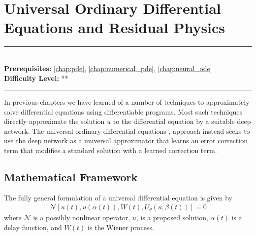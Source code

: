 \documentclass[book.tex]{subfiles}
\begin{document}
\chapter{Universal Ordinary Differential Equations and Residual Physics}

\label{chap:pinns}
\noindent\rule{11cm}{0.4pt} \\
\textbf{Prerequisites:}  \autoref{chap:pde}, \autoref{chap:numerical_pde}, \autoref{chap:neural_ode}  \\
\textbf{Difficulty Level:} ** \\
\noindent\rule{11cm}{0.4pt}
\vspace{5mm}

In previous chapters we have learned of a number of techniques to approximately solve differential equations using differentiable programs. Most such techniques directly approximate the solution $u$ to the differential equation by a suitable deep network. The universal ordinary differential equations \cite{bills2020universal}, \cite{rackauckas2020universal} approach instead seeks to use the deep network as a universal approximator that learns an error correction term that modifies a standard solution with a learned correction term.


\section{Mathematical Framework} 

The fully general formulation of a universal differential equation is given by
\begin{align}
    \mathcal{N}[u(t), u(\alpha(t)), W(t), U_\theta(u, \beta(t))] = 0
\end{align}
where $\mathcal{N}$ is a possibly nonlinear operator, $u$, is a proposed solution, $\alpha(t)$ is a delay function, and $W(t)$ is the Wiener process.
\end{document}
